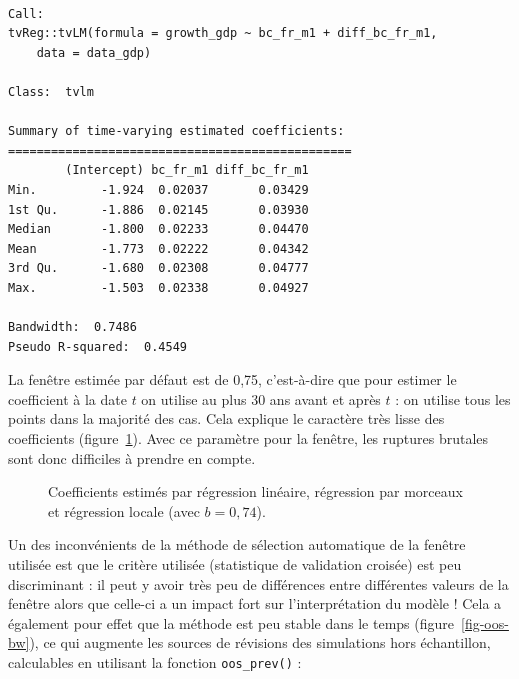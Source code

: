 \documentclass[
  a4paper,
  DIV=11,
  numbers=noendperiod,
  french]{scrartcl}
\newcommand\1{{\mathds 1}}
\theoremstyle{remark}
\begin{document}
\begin{verbatim}

Call: 
tvReg::tvLM(formula = growth_gdp ~ bc_fr_m1 + diff_bc_fr_m1, 
    data = data_gdp)

Class:  tvlm 

Summary of time-varying estimated coefficients: 
================================================ 
        (Intercept) bc_fr_m1 diff_bc_fr_m1
Min.         -1.924  0.02037       0.03429
1st Qu.      -1.886  0.02145       0.03930
Median       -1.800  0.02233       0.04470
Mean         -1.773  0.02222       0.04342
3rd Qu.      -1.680  0.02308       0.04777
Max.         -1.503  0.02338       0.04927

Bandwidth:  0.7486
Pseudo R-squared:  0.4549 
\end{verbatim}

La fenêtre estimée par défaut est de 0,75, c'est-à-dire que pour estimer
le coefficient à la date \(t\) on utilise au plus 30 ans avant et après
\(t\) : on utilise tous les points dans la majorité des cas. Cela
explique le caractère très lisse des coefficients
(figure~\ref{fig-coef-reg-mobile}). Avec ce paramètre pour la fenêtre,
les ruptures brutales sont donc difficiles à prendre en compte.

\begin{figure}

\caption{\label{fig-coef-reg-mobile}Coefficients estimés par régression
linéaire, régression par morceaux et régression locale (avec
\(b=0,74\)).}


\end{figure}%

Un des inconvénients de la méthode de sélection automatique de la
fenêtre utilisée est que le critère utilisée (statistique de validation
croisée) est peu discriminant \autocite[voir notamment][]{Loader1999} :
il peut y avoir très peu de différences entre différentes valeurs de la
fenêtre alors que celle-ci a un impact fort sur l'interprétation du
modèle ! Cela a également pour effet que la méthode est peu stable dans
le temps (figure~\ref{fig-oos-bw}), ce qui augmente les sources de
révisions des simulations hors échantillon, calculables en utilisant la
fonction \texttt{oos\_prev()} :
\end{document}
